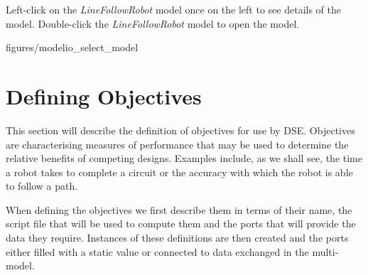 \documentclass[11pt,a4paper]{../tutorial}
\begin{document}
\begin{instructions}
\item Left-click on the \emph{LineFollowRobot} model once on the left to see details of the model. Double-click the \emph{LineFollowRobot} model to open the model.

\begin{center}
\begin{annotation}[width=1\linewidth,trim=0 300 0 0,clip]{figures/modelio_select_model}
    \end{annotation}
\end{center}

\end{instructions}






\newpage
\section{Defining Objectives}
\label{sec:obj_def}

This section will describe the definition of objectives for use by DSE.  Objectives are characterising measures of performance that may be used to determine the relative benefits of competing designs.  Examples include, as we shall see, the time a robot takes to complete a circuit or the accuracy with which the robot is able to follow a path.

When defining the objectives we first describe them in terms of their name, the script file that will be used to compute them and the ports that will provide the data they require.  Instances of these definitions are then created and the ports either filled with a static value or connected to data exchanged in the multi-model.
\end{document}
